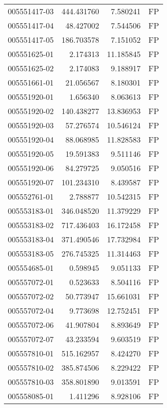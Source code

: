 \begin{tabular}{lrrl}
005551417-03 &  444.431760 &       7.580241 &   FP \\
005551417-04 &   48.427002 &       7.544506 &   FP \\
005551417-05 &  186.703578 &       7.151052 &   FP \\
005551625-01 &    2.174313 &      11.185845 &   FP \\
005551625-02 &    2.174083 &       9.188917 &   FP \\
005551661-01 &   21.056567 &       8.180301 &   FP \\
005551920-01 &    1.656340 &       8.063613 &   FP \\
005551920-02 &  140.438277 &      13.836953 &   FP \\
005551920-03 &   57.276574 &      10.546124 &   FP \\
005551920-04 &   88.068985 &      11.828583 &   FP \\
005551920-05 &   19.591383 &       9.511146 &   FP \\
005551920-06 &   84.279725 &       9.050516 &   FP \\
005551920-07 &  101.234310 &       8.439587 &   FP \\
005552761-01 &    2.788877 &      10.542315 &   FP \\
005553183-01 &  346.048520 &      11.379229 &   FP \\
005553183-02 &  717.436403 &      16.172458 &   FP \\
005553183-04 &  371.490546 &      17.732984 &   FP \\
005553183-05 &  276.745325 &      11.314463 &   FP \\
005554685-01 &    0.598945 &       9.051133 &   FP \\
005557072-01 &    0.523633 &       8.504116 &   FP \\
005557072-02 &   50.773947 &      15.661031 &   FP \\
005557072-04 &    9.773698 &      12.752451 &   FP \\
005557072-06 &   41.907804 &       8.893649 &   FP \\
005557072-07 &   43.233594 &       9.603519 &   FP \\
005557810-01 &  515.162957 &       8.424270 &   FP \\
005557810-02 &  385.874506 &       8.229422 &   FP \\
005557810-03 &  358.801890 &       9.013591 &   FP \\
005558085-01 &    1.411296 &       8.928106 &   FP \\

\end{tabular}
